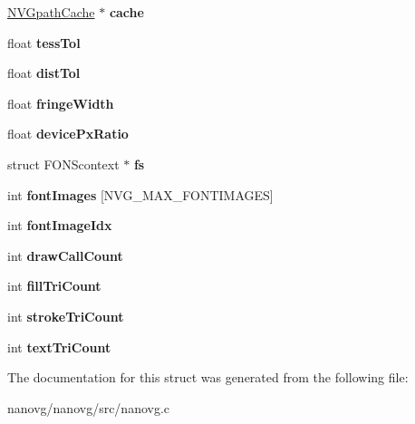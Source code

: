 \begin{DoxyCompactItemize}
\item 
\hypertarget{struct_n_v_gcontext_a17a8415e9c5d923134a2b25c237200b5}{\hyperlink{struct_n_v_gpath_cache}{N\+V\+Gpath\+Cache} $\ast$ {\bfseries cache}}\label{struct_n_v_gcontext_a17a8415e9c5d923134a2b25c237200b5}

\item 
\hypertarget{struct_n_v_gcontext_a12879e67beadb4dfd5dbd43aa8b87de9}{float {\bfseries tess\+Tol}}\label{struct_n_v_gcontext_a12879e67beadb4dfd5dbd43aa8b87de9}

\item 
\hypertarget{struct_n_v_gcontext_a211c3cdfeb97271da5fda042a136b2d4}{float {\bfseries dist\+Tol}}\label{struct_n_v_gcontext_a211c3cdfeb97271da5fda042a136b2d4}

\item 
\hypertarget{struct_n_v_gcontext_a3302fa98005c6cb433b79afc87ae6cab}{float {\bfseries fringe\+Width}}\label{struct_n_v_gcontext_a3302fa98005c6cb433b79afc87ae6cab}

\item 
\hypertarget{struct_n_v_gcontext_ac0f07cffd892243e5a9e312378177404}{float {\bfseries device\+Px\+Ratio}}\label{struct_n_v_gcontext_ac0f07cffd892243e5a9e312378177404}

\item 
\hypertarget{struct_n_v_gcontext_ac871fe2ad80359e19231aafeebff0289}{struct F\+O\+N\+Scontext $\ast$ {\bfseries fs}}\label{struct_n_v_gcontext_ac871fe2ad80359e19231aafeebff0289}

\item 
\hypertarget{struct_n_v_gcontext_aee74814cc074296ec088007f1a43a6ab}{int {\bfseries font\+Images} \mbox{[}N\+V\+G\+\_\+\+M\+A\+X\+\_\+\+F\+O\+N\+T\+I\+M\+A\+G\+E\+S\mbox{]}}\label{struct_n_v_gcontext_aee74814cc074296ec088007f1a43a6ab}

\item 
\hypertarget{struct_n_v_gcontext_a1ffb01f1d348a9b21b4a1fdd911499e3}{int {\bfseries font\+Image\+Idx}}\label{struct_n_v_gcontext_a1ffb01f1d348a9b21b4a1fdd911499e3}

\item 
\hypertarget{struct_n_v_gcontext_a28cd8a8b1554599f13d4314e7ac4b80f}{int {\bfseries draw\+Call\+Count}}\label{struct_n_v_gcontext_a28cd8a8b1554599f13d4314e7ac4b80f}

\item 
\hypertarget{struct_n_v_gcontext_a11846e12820c5acac46edb9f0b12d289}{int {\bfseries fill\+Tri\+Count}}\label{struct_n_v_gcontext_a11846e12820c5acac46edb9f0b12d289}

\item 
\hypertarget{struct_n_v_gcontext_a543111c48849661847b5bf9707e7aac6}{int {\bfseries stroke\+Tri\+Count}}\label{struct_n_v_gcontext_a543111c48849661847b5bf9707e7aac6}

\item 
\hypertarget{struct_n_v_gcontext_ae02585c93bfdeab6edd75d4777480ed1}{int {\bfseries text\+Tri\+Count}}\label{struct_n_v_gcontext_ae02585c93bfdeab6edd75d4777480ed1}

\end{DoxyCompactItemize}


The documentation for this struct was generated from the following file\+:\begin{DoxyCompactItemize}
\item 
nanovg/nanovg/src/nanovg.\+c\end{DoxyCompactItemize}

